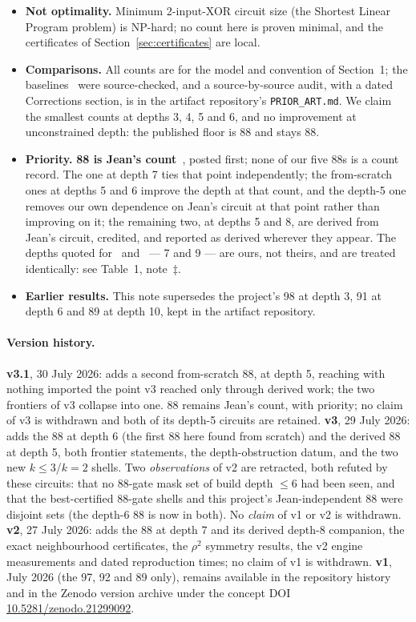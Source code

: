 \documentclass[11pt,a4paper]{article}
\begin{document}
\begin{itemize}
\item \textbf{Not optimality.} Minimum 2-input-XOR circuit size (the Shortest
  Linear Program problem) is NP-hard; no count here is proven minimal, and the
  certificates of Section~\ref{sec:certificates} are local.
\item \textbf{Comparisons.} All counts are for the model and convention of
  Section~1; the
  baselines~\cite{SFX23,OC24,Max19,XZLBZ20,LXZZ21,YWSZZ24,SYL25,Jean26} were
  source-checked, and a source-by-source audit, with a dated Corrections
  section, is in the artifact repository's \texttt{PRIOR\_ART.md}. We claim the
  smallest counts at depths 3, 4, 5 and 6, and no improvement at unconstrained
  depth: the published floor is 88 and stays 88.
\item \textbf{Priority.} \textbf{88 is Jean's count}~\cite{Jean26}, posted
  first; none of our five 88s is a count record. The one at depth 7 ties that
  point independently; the from-scratch ones at depths 5 and 6 improve the depth
  at that count, and the depth-5 one removes our own dependence on Jean's
  circuit at that point rather than improving on it; the remaining two, at
  depths 5 and 8, are derived from Jean's circuit, credited, and reported
  as derived wherever they appear. The depths quoted for~\cite{Jean26}
  and~\cite{SYL25} --- 7 and 9 --- are ours, not theirs, and are treated
  identically: see Table~1, note~$\ddagger$.
\item \textbf{Earlier results.} This note supersedes the project's 98 at depth
  3, 91 at depth 6 and 89 at depth 10, kept in the artifact repository.
\end{itemize}

\paragraph{Version history.} \textbf{v3.1}, 30 July 2026: adds a second
from-scratch 88, at depth 5, reaching with nothing imported the point v3 reached
only through derived work; the two frontiers of v3 collapse into one. 88 remains
Jean's count, with priority; no claim of v3 is withdrawn and both of its depth-5
circuits are retained. \textbf{v3}, 29 July 2026: adds the 88 at depth 6
(the first 88 here found from scratch) and the derived 88 at depth 5, both
frontier statements, the depth-obstruction datum, and the two new $k \le 3$/$k=2$
shells. Two \emph{observations} of v2 are retracted, both refuted by these
circuits: that no 88-gate mask set of build depth $\le 6$ had been seen, and that
the best-certified 88-gate shells and this project's Jean-independent 88 were
disjoint sets (the depth-6 88 is now in both). No \emph{claim} of v1 or v2 is
withdrawn. \textbf{v2}, 27 July 2026: adds the 88 at depth 7
and its derived depth-8 companion, the exact neighbourhood certificates, the
$\rho^2$ symmetry results, the v2 engine measurements and dated reproduction
times; no claim of v1 is withdrawn. \textbf{v1}, July 2026 (the 97, 92 and 89
only), remains available in the repository history and in the Zenodo version
archive under the concept DOI
\href{https://doi.org/10.5281/zenodo.21299092}{10.5281/zenodo.21299092}.
\end{document}
